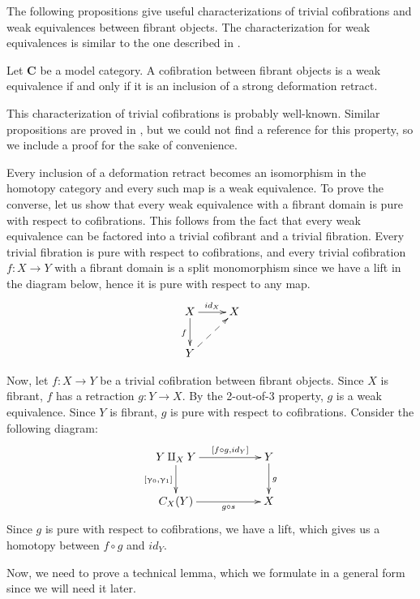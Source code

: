\documentclass{tac}
\theoremstyle{definition}
\newcommand{\cat}[1]{\mathbf{#1}}
\newcommand{\C}{\cat{C}}
\newcommand{\cyli}{\upgamma}
\begin{document}
The following propositions give useful characterizations of trivial
cofibrations and weak equivalences between fibrant objects.
The characterization for weak equivalences is similar to the one described in \cite{vogt-we}.

\begin{prop}
Let $\C$ be a model category.
A cofibration between fibrant objects is a weak equivalence if and only if it is an inclusion of a strong deformation retract.
\end{prop}

This characterization of trivial cofibrations is probably well-known.
Similar propositions are proved in \cite{hirschhorn}, but we could not find a reference for this property, so we include a proof for the sake of convenience.

\proof
Every inclusion of a deformation retract becomes an isomorphism in the homotopy category and every such map is a weak equivalence.
To prove the converse, let us show that every weak equivalence with a fibrant domain is pure with respect to cofibrations.
This follows from the fact that every weak equivalence can be factored into a trivial cofibrant and a trivial fibration.
Every trivial fibration is pure with respect to cofibrations, and every trivial cofibration $f : X \to Y$ with a fibrant domain is a split monomorphism since we have a lift in the diagram below,
hence it is pure with respect to any map.
\[ \xymatrix{ X \ar[r]^{id_X} \ar[d]_f & X \\
              Y \ar@{-->}[ur]
            } \]

Now, let $f : X \to Y$ be a trivial cofibration between fibrant objects.
Since $X$ is fibrant, $f$ has a retraction $g : Y \to X$.
By the 2-out-of-3 property, $g$ is a weak equivalence.
Since $Y$ is fibrant, $g$ is pure with respect to cofibrations.
Consider the following diagram:
\[ \xymatrix{ Y \amalg_X Y \ar[rr]^-{[f \circ g, id_Y]} \ar[d]_{[\cyli_0,\cyli_1]} & & Y \ar[d]^g \\
              C_X(Y) \ar[rr]_-{g \circ s} & & X
            } \]
Since $g$ is pure with respect to cofibrations, we have a lift, which gives us a homotopy between $f \circ g$ and $id_Y$.
\endproof

Now, we need to prove a technical lemma, which we formulate in a general form since we will need it later.
\end{document}
